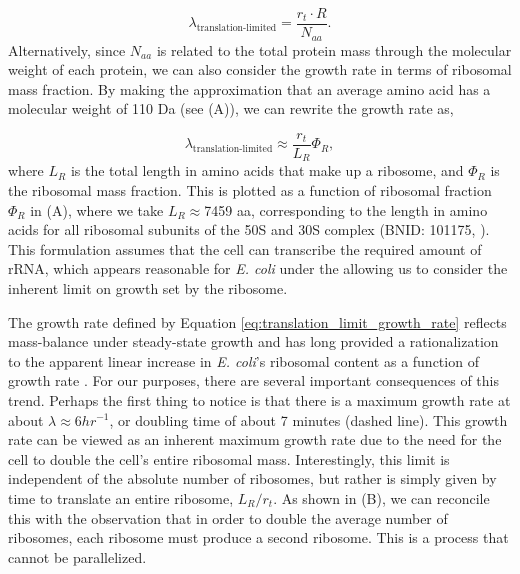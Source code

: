 \begin{equation}
\lambda_{\textrm{translation-limited}} = \frac{ r_t \cdot R}{N_{aa}}.
\end{equation}
Alternatively, since $N_{aa}$ is related to the total protein mass through the
molecular weight of each protein, we can also consider the growth rate in terms
of ribosomal mass fraction. By making the approximation that an average amino
acid has a molecular weight of 110 Da (see (A)), we can
rewrite the growth rate as,

\begin{equation}
\lambda_{\textrm{translation-limited}} \approx \frac{r_t}{L_R}  \Phi_R,
\label{eq:translation_limit_growth_rate}
\end{equation}
where $L_R$ is the total length in amino acids that make up a ribosome, and
$\Phi_R$ is the ribosomal mass fraction. This is plotted as a function of
ribosomal fraction $\Phi_R$ in (A), where we take $L_R
\approx $7459 aa, corresponding to the length in amino acids for all ribosomal
subunits of the 50S and 30S complex (BNID: 101175, \citep{milo2010}). This
formulation assumes that the cell can transcribe the required amount of rRNA,
which appears reasonable for  \textit{E. coli} under the  allowing us to
consider the inherent limit on growth set by the ribosome.

The growth rate defined by Equation \ref{eq:translation_limit_growth_rate}
reflects  mass-balance under steady-state growth and has long provided a
rationalization to the apparent linear increase in \textit{E. coli}'s ribosomal
content as a function of growth rate \citep{Goldberger1979, scott2010}. For our
purposes, there are several important consequences of this trend. Perhaps the
first thing to notice is that there is a maximum growth rate at about $\lambda
\approx 6 hr^{-1}$, or doubling time of about 7 minutes (dashed line). This
growth rate can be viewed as an inherent maximum growth rate due to the need for
the cell to double the cell's entire ribosomal mass. Interestingly, this limit
is independent of the absolute number of ribosomes, but rather is simply given
by time to translate an entire ribosome, $L_R/ r_t$. As shown in
(B), we can reconcile this with the observation that in order
to double the average number of ribosomes, each ribosome must produce a second
ribosome. This is a process that cannot be parallelized.

